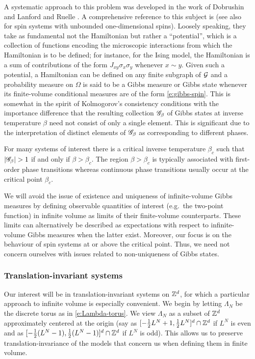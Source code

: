 A systematic approach to this problem was developed in the work of Dobrushin \cite{Dobrushin68}
and Lanford and Ruelle \cite{LR69}. A comprehensive reference to this subject is \cite{Georgii11}
(see also \cite{LP76} for spin systems with unbounded one-dimensional spins).
Loosely speaking, they take as fundamental not the Hamiltonian
but rather a ``potential'', which is a collection of functions encoding the microscopic interactions
from which the Hamiltonian is to be defined; for instance, for the Ising model,
the Hamiltonian is a sum of contributions of the form $J_{xy} \sigma_x \sigma_y$ whenever
$x \sim y$. Given such a potential, a Hamiltonian can be defined on any
finite subgraph of $\mathcal{G}$ and a probability measure on $\Omega$ is said to be a Gibbs
measure or Gibbs state whenever its finite-volume conditional measures are of the form \eqref{e:gibbs-spin}.
This is somewhat in the spirit of Kolmogorov's consistency conditions with the importance
difference that the resulting collection $\mathscr{G}_\beta$ of Gibbs states at inverse temperature
$\beta$ need not consist of only a single element. This is significant due to the interpretation
of distinct elements of $\mathscr{G}_\beta$ as corresponding to different phases.

For many systems of interest there is a critical inverse temperature $\beta_c$ such that
$|\mathscr{G}_\beta| > 1$ if and only if $\beta > \beta_c$. The region $\beta > \beta_c$ is typically
associated with first-order phase transitions whereas continuous phase transitions usually occur
at the critical point $\beta_c$.

We will avoid the issue of existence and uniqueness of infinite-volume Gibbs
measures
by defining observable quantities of interest (e.g.\ the two-point function) in infinite
volume as limits of their finite-volume counterparts. These limits can alternatively be
described as expectations with respect to infinite-volume Gibbs measures when the latter
exist. Moreover, our focus is on the behaviour of spin systems at or above the critical
point. Thus, we need not concern ourselves with issues related to non-uniqueness of Gibbs
states.

\subsubsection{Translation-invariant systems}

Our interest will be in translation-invariant systems on ${ {{\mathbb Z}}^d }$, for which a particular
approach to infinite volume is especially convenient. We begin by letting $\Lambda_N$
be the discrete torus as in \eqref{e:Lambda-torus}. We view $\Lambda_N$
as a subset of ${ {{\mathbb Z}}^d }$ approximately centered at the origin (say as
$[-\frac12 L^N+1,\frac12 L^N]^d \cap {\mathbb Z}^d$ if $L^N$ is even
and as $[-\frac12 (L^N-1), \frac12 (L^N-1)]^d \cap {\mathbb Z}^d$ if $L^N$ is odd). This allows us to preserve
translation-invariance of the models that concern us when defining them in finite volume.

